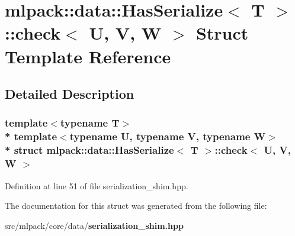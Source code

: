 \section{mlpack\+:\+:data\+:\+:Has\+Serialize$<$ T $>$\+:\+:check$<$ U, V, W $>$ Struct Template Reference}
\label{structmlpack_1_1data_1_1HasSerialize_1_1check}


\subsection{Detailed Description}
\subsubsection*{template$<$typename T$>$\\*
template$<$typename U, typename V, typename W$>$\\*
struct mlpack\+::data\+::\+Has\+Serialize$<$ T $>$\+::check$<$ U, V, W $>$}



Definition at line 51 of file serialization\+\_\+shim.\+hpp.



The documentation for this struct was generated from the following file\+:\begin{DoxyCompactItemize}
\item 
src/mlpack/core/data/{\bf serialization\+\_\+shim.\+hpp}\end{DoxyCompactItemize}
